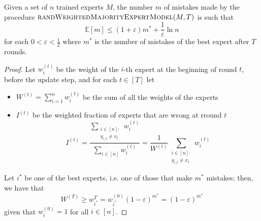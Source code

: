 \documentclass[a4paper, 12pt]{report}
\begin{document}
    \begin{framedthm}{}
        Given a set of $n$ trained experts $M$, the number $m$ of mistakes made by the procedure $\textsc{randWeightedMajorityExpertModel}(M, T)$ is such that $$\mathbb E [m] \le (1 + \varepsilon) m^* + \dfrac{1}{\varepsilon}\ln n$$ for each $0 < \varepsilon < \tfrac{1}{2}$ where $m^*$ is the number of mistakes of the best expert after $T$ rounds.
    \end{framedthm}

    \begin{proof}
        Let $w_i^{(t)}$ be the weight of the $i$-th expert at the beginning of round $t$, before the update step, and for each $t \in [T]$ let

        \begin{itemize}
            \item $W^{(t)} = \sum_{i = 1}^n{w_i^{(t)}}$ be the sum of all the weights of the experts
            \item $I^{(t)}$ be the weighted fraction of experts that are wrong at rround $t$ $$I^{(t)} = \dfrac{\sum_{\substack{i \in [n] : \\ y_{i, t} \neq x_t}}{w_i^{(t)}}}{\sum_{i \in [n]}{w_i^{(t)}}} = \dfrac{1}{W^{(t)}} \sum_{\substack{i \in [n] : \\ y_{i, t} \neq x_t}}{w_i^{(t)}}$$
        \end{itemize}

        Let $i^*$ be one of the best experts, i.e. one of those that make $m^*$ mistakes; then, we have that $$W^{(T)} \ge w_{i^*}^{T} = w_{i^*}^{(0)}(1 - \varepsilon)^{m^*} = (1 - \varepsilon)^{m^*}$$ given that $w_i^{(0)} = 1$ for all $i \in [n]$.



\end{proof}
\end{document}
